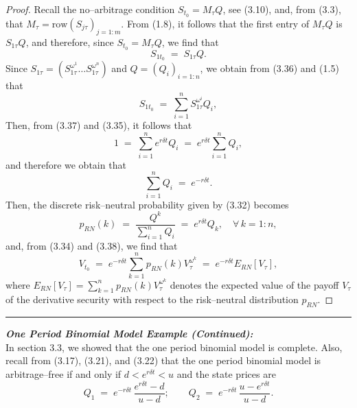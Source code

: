 \begin{proof}
Recall the no--arbitrage condition $S_{t_0} = M_\tau Q$, see (3.10), and,
from (3.3), that $M_\tau = \mathrm{row}(S_{j\tau})_{j=1:m}$. From (1.8), it
follows that the first entry of $M_\tau Q$ is $S_{1\tau}Q$, and therefore,
since $S_{t_0} = M_\tau Q$, we find that
\begin{equation}
S_{1t_0} \;=\; S_{1\tau}Q.
\end{equation}
Since $S_{1\tau} = (S_{1\tau}^{\omega^1} \ldots S_{1\tau}^{\omega^n})$ and
$Q = (Q_i)_{i=1:n}$, we obtain from (3.36) and (1.5) that
\begin{equation}
S_{1t_0} \;=\; \sum_{i=1}^n S_{1\tau}^{\omega^i} Q_i,
\end{equation}
Then, from (3.37) and (3.35), it follows that
\[
1 \;=\; \sum_{i=1}^n e^{r\delta t}Q_i \;=\; e^{r\delta t}\sum_{i=1}^n Q_i,
\]
and therefore we obtain that
\begin{equation}
\sum_{i=1}^n Q_i \;=\; e^{-r\delta t}.
\end{equation}
Then, the discrete risk--neutral probability given by (3.32) becomes
\begin{equation}
p_{RN}(k) \;=\; \frac{Q^k}{\sum_{i=1}^n Q_i} \;=\; e^{r\delta t}Q_k, \quad
\forall\, k = 1:n,
\end{equation}
and, from (3.34) and (3.38), we find that
\[
V_{t_0} \;=\; e^{-r\delta t}\sum_{k=1}^n p_{RN}(k)V_\tau^{\omega^k} \;=\;
e^{-r\delta t}E_{RN}\left[V_\tau\right],
\]
where $E_{RN}\left[V_\tau\right] = \sum_{k=1}^n p_{RN}(k)V_\tau^{\omega^k}$
denotes the expected value of the payoff $V_\tau$ of the derivative
security with respect to the risk--neutral distribution $p_{RN}$.
\end{proof}

\medskip
\noindent\rule{\linewidth}{0.4pt}
\medskip

\noindent\textbf{\textit{One Period Binomial Model Example (Continued):}}\\
In section 3.3, we showed that the one period binomial model is complete.
Also, recall from (3.17), (3.21), and (3.22) that the one period binomial
model is arbitrage--free if and only if $d < e^{r\delta t} < u$ and the
state prices are
\begin{equation}
Q_1 \;=\; e^{-r\delta t}\,\frac{e^{r\delta t} - d}{u - d}; \qquad
Q_2 \;=\; e^{-r\delta t}\,\frac{u - e^{r\delta t}}{u - d}.
\end{equation}

